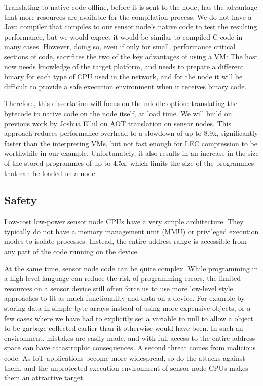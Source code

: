 Translating to native code offline, before it is sent to the node, has the advantage that more resources are available for the compilation process. We do not have a Java compiler that compiles to our sensor node's native code to test the resulting performance, but we would expect it would be similar to compiled C code in many cases. However, doing so, even if only for small, performance critical sections of code, sacrifices the two of the key advantages of using a VM: The host now needs knowledge of the target platform, and needs to prepare a different binary for each type of CPU used in the network, and for the node it will be difficult to provide a safe execution environment when it receives binary code.

Therefore, this dissertation will focus on the middle option: translating the bytecode to native code on the node itself, at load time. We will build on previous work by Joshua Ellul \cite{Ellul:2012thesis} on AOT translation on sensor nodes. This approach reduces performance overhead to a slowdown of up to 8.9x, significantly faster than the interpreting VMs, but not fast enough for LEC compression to be worthwhile in our example. Unfortunately, it also results in an increase in the size of the stored programmes of up to 4.5x, which limits the size of the programmes that can be loaded on a node.

\subsection{Safety}
\label{sec-introduction-safety}
Low-cost low-power sensor node CPUs have a very simple architecture. They typically do not have a memory management unit (MMU) or privileged execution modes to isolate processes. Instead, the entire address range is accessible from any part of the code running on the device.

At the same time, sensor node code can be quite complex. While programming in a high-level language can reduce the risk of programming errors, the limited resources on a sensor device still often force us to use more low-level style approaches to fit as much functionality and data on a device. For example by storing data in simple byte arrays instead of using more expensive objects, or a few cases where we have had to explicitly set a variable to null to allow a object to be garbage collected earlier than it otherwise would have been. In such an environment, mistakes are easily made, and with full access to the entire address space can have catastrophic consequences. A second threat comes from malicious code. As IoT applications become more widespread, so do the attacks against them, and the unprotected execution environment of sensor node CPUs makes them an attractive target.

